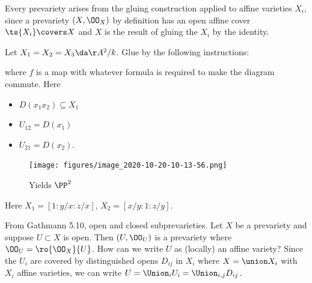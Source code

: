 Every prevariety arises from the gluing construction applied to affine
varieties \(X_i\), since a prevariety \((X, \OO_X)\) by definition has
an open affine cover \(\ts{X_i} \covers X\) and \(X\) is the result of
gluing the \(X_i\) by the identity.

\begin{example}

Let \(X_1 = X_2 = X_3 \da \AA^2/k\). Glue by the following instructions:

\begin{center}
\end{center}

where \(f\) is a map with whatever formula is required to make the
diagram commute. Here

\begin{itemize}
\tightlist
\item
  \(D(x_1 x_2) \subseteq X_1\)
\item
  \(U_{12} = D(x_1)\)
\item
  \(U_{21} = D(x_2)\).
\end{itemize}

\begin{figure}
\centering
\texttt{[image: figures/image\_2020-10-20-10-13-56.png]}
\caption{Yields \(\PP^2\)}
\end{figure}

Here \(X_1 = [1: y/x: z/x]\), \(X_2 = [x/y: 1: z/y]\).

\end{example}

\begin{example}

From Gathmann 5.10, open and closed subprevarieties. Let \(X\) be a
prevariety and suppose \(U\subset X\) is open. Then \((U, \OO_U)\) is a
prevariety where \(\OO_U = \ro{\OO_X}{U}\). How can we write \(U\) as
(locally) an affine variety? Since the \(U_i\) are covered by
distinguished opens \(D_{ij}\) in \(X_i\) where \(X = \union X_i\) with
\(X_i\) affine varieties, we can write
\(U = \Union_i U_i = \Union_{i, j} D_{ij}\).

\end{example}

